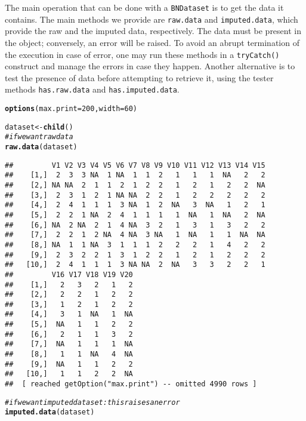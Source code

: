\documentclass{article}\usepackage[]{graphicx}\usepackage[]{color}
\makeatletter
\newcommand{\hlnum}[1]{\textcolor[rgb]{0.686,0.059,0.569}{#1}}%
\newcommand{\hlcom}[1]{\textcolor[rgb]{0.678,0.584,0.686}{\textit{#1}}}%
\newcommand{\hlstd}[1]{\textcolor[rgb]{0.345,0.345,0.345}{#1}}%
\newcommand{\hlkwb}[1]{\textcolor[rgb]{0.69,0.353,0.396}{#1}}%
\newcommand{\hlkwc}[1]{\textcolor[rgb]{0.333,0.667,0.333}{#1}}%
\newcommand{\hlkwd}[1]{\textcolor[rgb]{0.737,0.353,0.396}{\textbf{#1}}}%
\newenvironment{kframe}{%
 \def\at@end@of@kframe{}%
 \ifinner\ifhmode%
  \def\at@end@of@kframe{\end{minipage}}%
  \begin{minipage}{\columnwidth}%
 \fi\fi%
 \def\FrameCommand##1{\hskip\@totalleftmargin \hskip-\fboxsep
 \colorbox{shadecolor}{##1}\hskip-\fboxsep
     \hskip-\linewidth \hskip-\@totalleftmargin \hskip\columnwidth}%
 \MakeFramed {\advance\hsize-\width
   \@totalleftmargin\z@ \linewidth\hsize
   \@setminipage}}%
 {\par\unskip\endMakeFramed%
 \at@end@of@kframe}
\newenvironment{knitrout}{}{} %
\newcommand{\Robject}[1]{{\texttt{#1}}}
\newcommand{\Rmethod}[1]{{\texttt{#1}}}
\makeatother
\begin{document}
The main operation that can be done with a \Robject{BNDataset} is to get the data it contains.
The main methods we provide are \Rmethod{raw.data} and \Rmethod{imputed.data}, which provide the raw and the
imputed data, respectively. The data must be present in the object; conversely, an error will be raised.
To avoid an abrupt termination of the execution in case of error, one may run these methods in a
\Rmethod{tryCatch()} construct and manage the errors in case they happen. Another alternative is to test
the presence of data before attempting to retrieve it, using the tester methods \Rmethod{has.raw.data} and
\Rmethod{has.imputed.data}.

\begin{knitrout}
\color{fgcolor}\begin{kframe}
\begin{alltt}
\hlkwd{options}\hlstd{(}\hlkwc{max.print} \hlstd{=} \hlnum{200}\hlstd{,} \hlkwc{width} \hlstd{=} \hlnum{60}\hlstd{)}

\hlstd{dataset} \hlkwb{<-} \hlkwd{child}\hlstd{()}
\hlcom{# if we want raw data}
\hlkwd{raw.data}\hlstd{(dataset)}
\end{alltt}
\begin{verbatim}
##         V1 V2 V3 V4 V5 V6 V7 V8 V9 V10 V11 V12 V13 V14 V15
##    [1,]  2  3  3 NA  1 NA  1  1  2   1   1   1  NA   2   2
##    [2,] NA NA  2  1  1  2  1  2  2   1   2   1   2   2  NA
##    [3,]  2  3  1  2  1 NA NA  2  2   1   2   2   2   2   2
##    [4,]  2  4  1  1  1  3 NA  1  2  NA   3  NA   1   2   1
##    [5,]  2  2  1 NA  2  4  1  1  1   1  NA   1  NA   2  NA
##    [6,] NA  2 NA  2  1  4 NA  3  2   1   3   1   3   2   2
##    [7,]  2  2  1  2 NA  4 NA  3 NA   1  NA   1   1  NA  NA
##    [8,] NA  1  1 NA  3  1  1  1  2   2   2   1   4   2   2
##    [9,]  2  3  2  2  1  3  1  2  2   1   2   1   2   2   2
##   [10,]  2  4  1  1  1  3 NA NA  2  NA   3   3   2   2   1
##         V16 V17 V18 V19 V20
##    [1,]   2   3   2   1   2
##    [2,]   2   2   1   2   2
##    [3,]   1   2   1   2   2
##    [4,]   3   1  NA   1  NA
##    [5,]  NA   1   1   2   2
##    [6,]   2   1   1   3   2
##    [7,]  NA   1   1   1  NA
##    [8,]   1   1  NA   4  NA
##    [9,]  NA   1   1   2   2
##   [10,]   1   1   2   2  NA
##  [ reached getOption("max.print") -- omitted 4990 rows ]
\end{verbatim}
\begin{alltt}
\hlcom{# if we want imputed dataset: this raises an error}
\hlkwd{imputed.data}\hlstd{(dataset)}
\end{alltt}



\end{kframe}
\end{knitrout}
\end{document}
